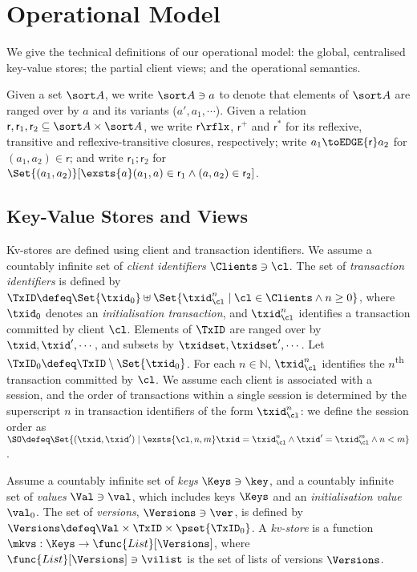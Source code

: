 \section{Operational Model}
\label{sec:model}

We give the technical definitions of our operational model: 
the global, centralised key-value stores; the partial client views;  and the
operational semantics. 

Given a set $\sort A$, we write $\sort A \ni a$ to denote that elements of $\sort A$ are ranged over by $a$ and its variants (\eg $a', a_1, \cdots$). 
Given a relation $\mathsf r, \mathsf r_1, \mathsf r_2 \subseteq \sort A \times \sort A$,
we write $\mathsf r\rflx$, $\mathsf r^+$ and $\mathsf r^*$ for its reflexive, transitive and reflexive-transitive closures, respectively;
write $a_1 \toEDGE{\mathsf r} a_2$ for $(a_1, a_2) \in \mathsf r$;
and write \( \mathsf r_1 ; \mathsf r_2\) for \( \Set{(a_1,a_2)}[\exsts{a} (a_1,a) \in \mathsf r_1 \land (a,a_2) \in \mathsf r_2]\).

\subsection{Key-Value Stores and Views}
\label{subsec:kvstores}
\label{sec:mkvs-view}
Kv-stores are defined using client and transaction identifiers.
We assume a countably infinite set of \emph{client identifiers} $\Clients \ni \cl$. 
The set of \emph{transaction identifiers} is defined by
$\TxID \defeq  \Set{\txid_{0}} \uplus \Set{ \txid_{\cl}^{n} \mid \cl
  \in \Clients \land n \geq 0 }$, 
where  $\txid_0$ denotes  an \emph{initialisation transaction}, 
and $\txid_{\cl}^{n}$ identifies a transaction committed by client $\cl$. 
Elements of $\TxID$ are ranged over by
$\txid, \txid', \cdots$, and subsets by $\txidset, \txidset', \cdots$. 
Let $\TxID_{0} \defeq \TxID \setminus \Set{\txid_0}$. 
For each $n \in \mathbb{N}$, $\txid_{\cl}^{n}$ identifies the $n$\textsuperscript{th} transaction  committed by $\cl$.
We assume each client is associated with a session, 
and the order of transactions within a single session is determined by the superscript 
$n$ in transaction identifiers of the form $\txid_{\cl}^{n}$: we define the session order 
as 
$\SO \defeq \Set{ (\txid, \txid') \mid \exsts{ \cl, n,m } \txid =
\txid_{\cl}^{n} \land \txid' = \txid_{\cl}^{m} \land n < m}$.

\begin{definition}[Kv-stores]
\label{def:his_heap}
\label{def:mkvs}
Assume a countably infinite set of \emph{keys} $\Keys \ni \key$, 
and a countably infinite set of  \emph{values} $\Val \ni \val$, 
which includes keys \( \Keys \) and an \emph{initialisation value} $\val_0$.
The set of \emph{versions}, $\Versions \ni \ver$, is defined by $\Versions \defeq \Val \times \TxID \times \pset{\TxID_{0}}$. 
A \emph{kv-store} 
is a function $\mkvs: \Keys \to \func{List}[\Versions]$, 
where $\func{List}[\Versions] \ni \vilist$ is the set of lists of versions $\Versions$. 
\end{definition}

